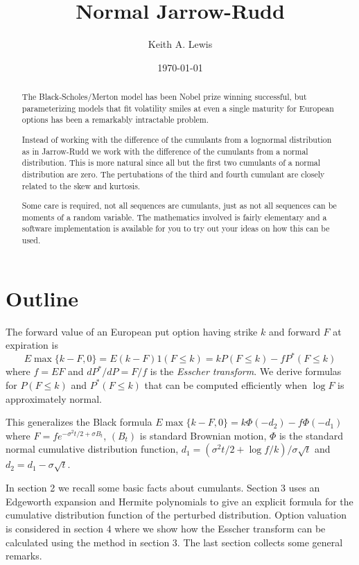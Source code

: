 \documentclass[11pt]{article}
\title{Normal Jarrow-Rudd}
\author{Keith A. Lewis}
\date{\today}
\theoremstyle{definition}
\begin{document}
\maketitle
\begin{abstract}
The Black-Scholes/Merton model has been Nobel prize winning successful,
but parameterizing models that fit volatility smiles at even a single
maturity for European options has been a remarkably
intractable problem.

Instead of working with the difference of the cumulants from a lognormal
distribution as in Jarrow-Rudd \cite{JarRud1982} we work with the
difference of the cumulants from a normal distribution.  This is more
natural since all but the first two cumulants of a normal distribution
are zero. The pertubations of the third and fourth cumulant are closely
related to the skew and kurtosis.

Some care is required, not all sequences are cumulants, just as
not all sequences can be moments of a random variable.
The mathematics involved is fairly elementary and a software
implementation is available for you to try out your ideas
on how this can be used.
\end{abstract}

\section{Outline}
The forward value of an European put option having strike \(k\)
and forward $F$ at expiration is
\[
E\max\{k - F, 0\} = E(k - F)1(F \le k) = kP(F\le k) - fP^*(F\le k)
\]
where $f = EF$ and $dP^*/dP = F/f$
is the {\em Esscher transform}\cite{Ess1932}.
We derive formulas for
\(P(F\le k)\) and \(P^*(F\le k)\) that can be computed
efficiently when $\log F$ is approximately normal.

This generalizes the Black formula
\(E\max\{k - F,0\} = k\Phi(-d_2) - f\Phi(-d_1)\)
where \(F = fe^{-\sigma^2t/2 + \sigma B_t}\), \((B_t)\) is
standard Brownian motion, \(\Phi\) is the standard normal cumulative
distribution function, \(d_1 = (\sigma^2 t/2
+ \log f/k)/\sigma\sqrt{t}\) and \(d_2 = d_1 - \sigma\sqrt{t}\).

In section 2 we recall some basic facts about cumulants.  Section 3 uses
an Edgeworth expansion and Hermite polynomials
to give an explicit formula for the cumulative
distribution function of the perturbed distribution.  Option valuation
is considered in section 4 where we show how the Esscher transform can be
calculated using the method in section 3. The last section
collects some general remarks.
\end{document}
